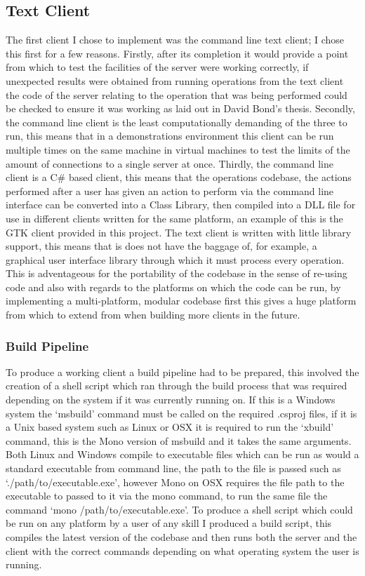 \documentclass{article}
\begin{document}
\subsection{Text Client}
The first client I chose to implement was the command line text client; I chose this first for a few reasons. Firstly, after its completion it would provide a point from which to test the facilities of the server were working correctly, if unexpected results were obtained from running operations from the text client the code of the server relating to the operation that was being performed could be checked to ensure it was working as laid out in David Bond’s thesis. Secondly, the command line client is the least computationally demanding of the three to run, this means that in a demonstrations environment this client can be run multiple times on the same machine in virtual machines to test the limits of the amount of connections to a single server at once. Thirdly, the command line client is a C\# based client, this means that the operations codebase, the actions performed after a user has given an action to perform via the command line interface can be converted into a Class Library, then compiled into a DLL file for use in different clients written for the same platform, an example of this is the GTK client provided in this project. The text client is written with little library support, this means that is does not have the baggage of, for example, a graphical user interface library through which it must process every operation. This is adventageous for the portability of the codebase in the sense of re-using code and also with regards to the platforms on which the code can be run, by implementing a multi-platform, modular codebase first this gives a huge platform from which to extend from when building more clients in the future. 
\subsubsection{Build Pipeline}
To produce a working client a build pipeline had to be prepared, this involved the creation of a shell script which ran through the build process that was required depending on the system if it was currently running on. If this is a Windows system the ‘msbuild’ command must be called on the required .csproj files, if it is a Unix based system such as Linux or OSX it is required to run the ‘xbuild’ command, this is the Mono version of msbuild and it takes the same arguments. Both Linux and Windows compile to executable files which can be run as would a standard executable from command line, the path to the file is passed such as ‘./path/to/executable.exe’, however Mono on OSX requires the file path to the executable to passed to it via the mono command, to run the same file the command ‘mono /path/to/executable.exe’. To produce a shell script which could be run on any platform by a user of any skill I produced a build script, this compiles the latest version of the codebase and then runs both the server and the client with the correct commands depending on what operating system the user is running.
\end{document}
